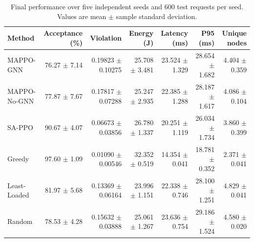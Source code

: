 \begin{table}[t]
\centering
\caption{Final performance over five independent seeds and 600 test requests per seed. Values are mean $\pm$ sample standard deviation.}
\label{tab:final_benchmark}
\begin{tabular}{lrrrrrr}
\hline
Method & Acceptance (\%) & Violation & Energy (J) & Latency (ms) & P95 (ms) & Unique nodes \\
\hline
MAPPO-GNN & 76.27 $\pm$ 7.14 & 0.19823 $\pm$ 0.10275 & 25.708 $\pm$ 3.481 & 23.524 $\pm$ 1.329 & 28.654 $\pm$ 1.682 & 4.404 $\pm$ 0.359 \\
MAPPO-No-GNN & 77.87 $\pm$ 7.67 & 0.17817 $\pm$ 0.07288 & 25.247 $\pm$ 2.935 & 22.385 $\pm$ 1.288 & 28.187 $\pm$ 1.617 & 4.086 $\pm$ 0.104 \\
SA-PPO & 90.67 $\pm$ 4.07 & 0.06673 $\pm$ 0.03856 & 26.780 $\pm$ 1.337 & 20.251 $\pm$ 1.119 & 26.034 $\pm$ 1.734 & 3.860 $\pm$ 0.399 \\
Greedy & 97.60 $\pm$ 1.09 & 0.01090 $\pm$ 0.00546 & 32.352 $\pm$ 0.519 & 14.354 $\pm$ 0.041 & 18.781 $\pm$ 0.352 & 2.371 $\pm$ 0.041 \\
Least-Loaded & 81.97 $\pm$ 5.68 & 0.13369 $\pm$ 0.06164 & 23.996 $\pm$ 1.151 & 22.338 $\pm$ 0.746 & 28.100 $\pm$ 1.251 & 4.829 $\pm$ 0.041 \\
Random & 78.53 $\pm$ 4.28 & 0.15632 $\pm$ 0.03888 & 25.061 $\pm$ 1.267 & 23.636 $\pm$ 0.754 & 29.186 $\pm$ 1.524 & 4.580 $\pm$ 0.020 \\
\hline
\end{tabular}
\end{table}
